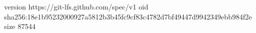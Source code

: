 version https://git-lfs.github.com/spec/v1
oid sha256:18e1b95232000927a5812b3b45fc9cf83c4782d7bf49447d9942349ebb984f2e
size 87544
